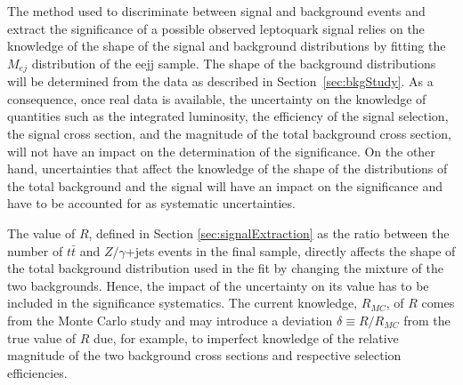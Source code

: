 \documentclass[colclass=cmspaper]{combine}
\begin{document}
\begin{linenumbers}



The method used to discriminate between signal and background events and extract the significance 
of a possible observed leptoquark signal 
relies on the knowledge of the shape of the signal and background distributions 
by fitting the $M_{ej}$ distribution of the eejj sample.
The shape of the background distributions will be determined from the data as 
described in Section~\ref{sec:bkgStudy}.
As a consequence, once real data is available, the uncertainty on the knowledge of quantities 
such as the integrated luminosity, the efficiency of the signal selection, the signal cross section, 
and the magnitude of the total background cross section, will not have an impact on the 
determination of the significance.
On the other hand, uncertainties that affect the knowledge of the shape of the distributions of 
the total background and the signal will have an impact on the significance and have to be 
accounted for as systematic uncertainties.

The value of $R$, defined in Section \ref{sec:signalExtraction} as 
the ratio between the number of $t\bar{t}$ and $Z/\gamma$+jets events in the final sample,
directly affects the shape of the total background distribution used in the fit by changing the
mixture of the two backgrounds. 
Hence, the impact of the uncertainty on its value has to be included in the significance systematics.
The current knowledge, $R_{MC}$, of $R$ comes from the Monte Carlo
study and may introduce a deviation $\delta \equiv R/R_{MC}$ from the true value of $R$
due, for example, to imperfect knowledge of the relative magnitude of the two background 
cross sections and respective selection efficiencies.


\end{linenumbers}
\end{document}
